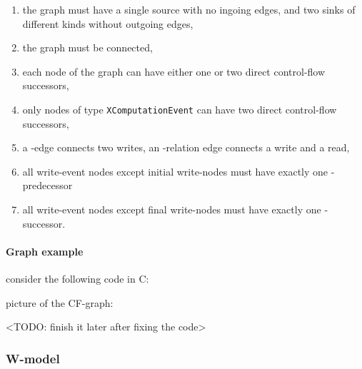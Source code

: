 \begin{enumerate}[noitemsep]
\item the graph must have a single source with no ingoing edges, and two sinks of different kinds without outgoing edges,
\item the graph must be connected,
\item each node of the graph can have either one or two direct control-flow successors,
\item only nodes of type \texttt{XComputationEvent} can have two direct control-flow successors,
\item a \co{}-edge connects two writes, an \rf{}-relation edge connects a write and a read,
\item all write-event nodes except initial write-nodes must have exactly one \co-predecessor
\item all write-event nodes except final write-nodes must have exactly one \co-successor.
\end{enumerate}




\paragraph{Graph example}
\label{ch:impl:model:xgraph:example}

consider the following code in C:

picture of the CF-graph:

<TODO: finish it later after fixing the code>


%

\subsubsection{W-model}
\label{ch:impl:model:wmodel}

